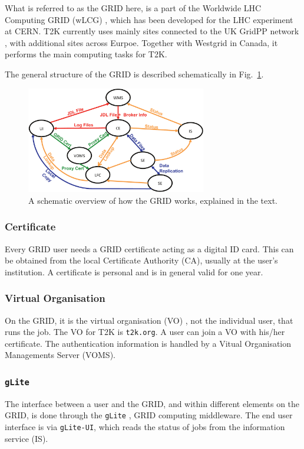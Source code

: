\documentclass[11pt]{article}
\begin{document}
What is referred to as the GRID here, is a part of the Worldwide LHC
Computing GRID (wLCG) \cite{lcg}, which has been developed for the LHC
experiment at CERN. T2K currently uses mainly sites connected to the
UK GridPP network \cite{gridpp}, with additional sites across Eurpoe.
Together with Westgrid in Canada, it performs the main computing tasks
for T2K.

The general structure of the GRID is described schematically in
Fig.~\ref{fig:schematic}.

\begin{figure}[!h]
  \begin{center}
    \includegraphics[width=0.7\textwidth]{gridoverview}
    \caption{\label{fig:schematic} A schematic overview of how the GRID works, explained in the text.}
  \end{center}
\end{figure}

\subsubsection*{Certificate}
Every GRID user needs a GRID certificate acting as a digital ID
card. This can be obtained from the local Certificate Authority
(CA), usually at the user's institution. A certificate is personal and
is in general valid for one year.

\subsubsection*{Virtual Organisation}
On the GRID, it is the virtual organisation (VO) \cite{cic}, not the
individual user, that runs the job. The VO for T2K is
\verb+t2k.org+. A user can join a VO with his/her certificate. The
authentication information is handled by a Vitual Organisation
Managements Server (VOMS).


\subsubsection*{\texttt{gLite}}
The interface between a user and the GRID, and within different
elements on the GRID, is done through the \verb+gLite+ \cite{glite},
GRID computing middleware. The end user interface is via \verb+gLite-UI+, which reads
the status of jobs from the information service (IS).
\end{document}
